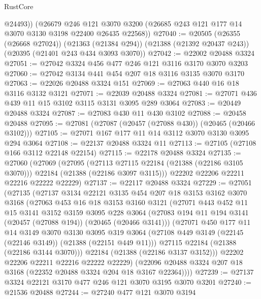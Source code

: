 \begin{lexlean}{RustCore}
\begin{coremodule}
        @24493))
    (@26679
      @246
      @121
      @3070
      @3200
      (@26685 @243 @121 @177 @14 @3070 @3130 @3198 @22400 @26435 @22568))
@27040 := @20505
    (@26355 (@26668 @27024))
    (@21363 (@21384 @294))
    (@21388 (@21392 @20437 @243))
    (@20395 (@21401 @243 @434 @3093 @3070))
@27042 := @22002 @20488 @3324
@27051 := @27042 @3324 @456 @477 @246 @121 @3116 @3170 @3070 @3203
@27060 := @27042 @3134 @441 @454 @207 @18 @3116 @3135 @3070 @3170
@27063 := @22026 @20488 @3324 @151
@27069 := @27063 @440 @16 @18 @3116 @3132 @3121
@27071 := @22039 @20488 @3324
@27081 := @27071 @436 @439 @11 @15 @3102 @3115 @3131 @3095 @289 @3064
@27083 := @20449 @20488 @3324
@27087 := @27083 @430 @11 @430 @3102
@27088 := @20458 @20488
@27095 := @27081 (@27087 (@20457 (@27088 @430)) (@20465 (@20466 @3102)))
@27105 := @27071 @167 @177 @11 @14 @3112 @3070 @3130 @3095 @294 @3064
@27108 := @22137 @20488 @3324 @11
@27113 := @27105 (@27108 @166 @3112 @22148 @22154)
@27115 := @22178 @20488 @3324
@27135 := @27060
    (@27069
      (@27095
        (@27113 @27115 @22184 (@21388 (@22186 @3105 @3070)))
        @22184
        (@21388 (@22186 @3097 @3115)))
      @22202
      @22206
      @22211
      @22216
      @22222
      @22229)
@27137 := @22117 @20488 @3324
@27229 := @27051
    (@27135
      (@27137
        @3134
        @22121
        @3135
        @454
        @207
        @18
        @3153
        @3162
        @3070
        @3168
        (@27063
          @453
          @16
          @18
          @3153
          @3160
          @3121
          (@27071
            @443
            @452
            @11
            @15
            @3141
            @3152
            @3159
            @3095
            @228
            @3064
            (@27083 @194 @11 @194 @3141 (@20457 (@27088 @194)) (@20465 (@20466 @3141)))
            (@27071
              @450
              @177
              @11
              @14
              @3149
              @3070
              @3130
              @3095
              @319
              @3064
              (@27108 @449 @3149 (@22145 (@22146 @3149)) (@21388 (@22151 @449 @11)))
              @27115
              @22184
              (@21388 (@22186 @3144 @3070)))
            @22184
            (@21388 (@22186 @3137 @3152)))
          @22202
          @22206
          @22211
          @22216
          @22222
          @22229)
        (@22096 @20488 @3324 @207 @18 @3168 (@22352 @20488 @3324 @204 @18 @3167 @22364))))
@27239 := @27137 @3324 @22121 @3170 @477 @246 @121 @3070 @3195 @3070 @3201
@27240 := @21536 @20488
@27244 := @27240 @477 @121 @3070 @3194

\end{coremodule}
\end{lexlean}
